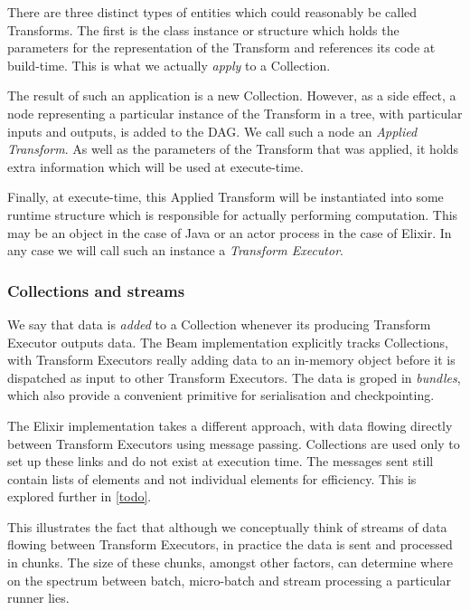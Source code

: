 There are three distinct types of entities which could reasonably be called Transforms.
The first is the class instance or structure which holds the parameters for the representation of the Transform and references its code at build-time.
This is what we actually \emph{apply} to a Collection.

The result of such an application is a new Collection.
However, as a side effect, a node representing a particular instance of the Transform in a tree, with particular inputs and outputs, is added to the DAG.
We call such a node an \emph{Applied Transform}.
As well as the parameters of the Transform that was applied, it holds extra information which will be used at execute-time.

Finally, at execute-time, this Applied Transform will be instantiated into some runtime structure which is responsible for actually performing computation.
This may be an object in the case of Java or an actor process in the case of Elixir.
In any case we will call such an instance a \emph{Transform Executor}.

\subsubsection{Collections and streams}

We say that data is \emph{added} to a Collection whenever its producing Transform Executor outputs data.
The Beam implementation explicitly tracks Collections, with Transform Executors really adding data to an in-memory object before it is dispatched as input to other Transform Executors.
The data is groped in \emph{bundles}, which also provide a convenient primitive for serialisation and checkpointing.

The Elixir implementation takes a different approach, with data flowing directly between Transform Executors using message passing.
Collections are used only to set up these links and do not exist at execution time.
The messages sent still contain lists of elements and not individual elements for efficiency.
This is explored further in \cref{todo}.

This illustrates the fact that although we conceptually think of streams of data flowing between Transform Executors, in practice the data is sent and processed in chunks.
The size of these chunks, amongst other factors, can determine where on the spectrum between batch, micro-batch and stream processing a particular runner lies.


